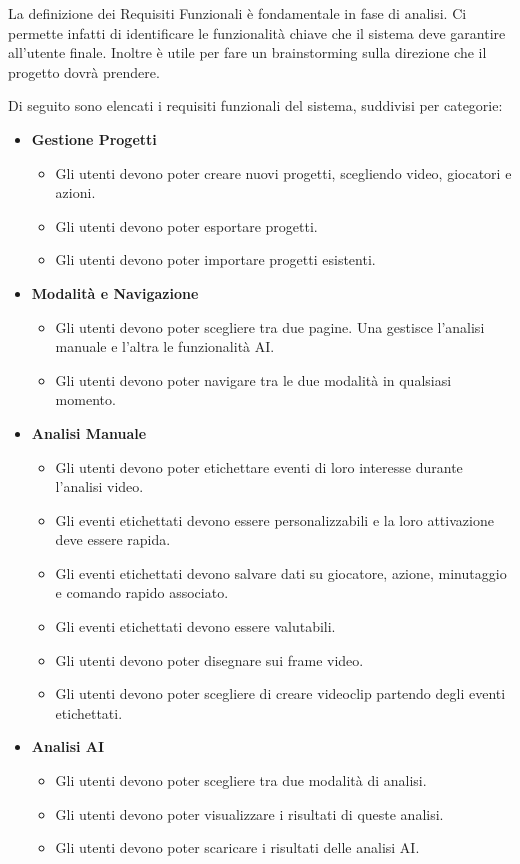 La definizione dei Requisiti Funzionali è fondamentale in fase di analisi. Ci permette infatti di identificare le funzionalità chiave che il sistema deve garantire all'utente finale. Inoltre è utile per fare un brainstorming sulla direzione che il progetto dovrà prendere.

\noindent Di seguito sono elencati i requisiti funzionali del sistema, suddivisi per categorie:

\begin{itemize}
    \item \textbf{Gestione Progetti}
    \begin{itemize}
        \item Gli utenti devono poter creare nuovi progetti, scegliendo video, giocatori e azioni.
        \item Gli utenti devono poter esportare progetti.
        \item Gli utenti devono poter importare progetti esistenti.
    \end{itemize}

    \item \textbf{Modalità e Navigazione}
    \begin{itemize}
        \item Gli utenti devono poter scegliere tra due pagine. Una gestisce l'analisi manuale e l'altra le funzionalità AI.
        \item Gli utenti devono poter navigare tra le due modalità in qualsiasi momento.
    \end{itemize}

    \item \textbf{Analisi Manuale}
    \begin{itemize}
        \item Gli utenti devono poter etichettare eventi di loro interesse durante l'analisi video.
        \item Gli eventi etichettati devono essere personalizzabili e la loro attivazione deve essere rapida.
        \item Gli eventi etichettati devono salvare dati su giocatore, azione, minutaggio e comando rapido associato.
        \item Gli eventi etichettati devono essere valutabili.
        \item Gli utenti devono poter disegnare sui frame video.
        \item Gli utenti devono poter scegliere di creare videoclip partendo degli eventi etichettati.
    \end{itemize}

    \item \textbf{Analisi AI}
    \begin{itemize}
        \item Gli utenti devono poter scegliere tra due modalità di analisi.
        \item Gli utenti devono poter visualizzare i risultati di queste analisi.
        \item Gli utenti devono poter scaricare i risultati delle analisi AI.
    \end{itemize}
\end{itemize}


